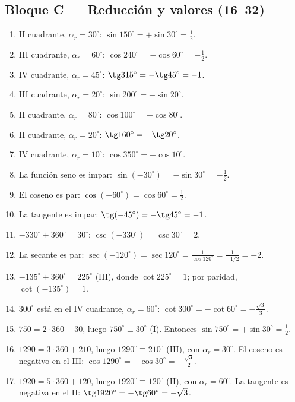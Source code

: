 \documentclass[12pt, letterpaper]{article}
\providecommand{\sen}{\sin}
\begin{document}
\subsection*{Bloque C — Reducción y valores (16--32)}
\begin{enumerate}[leftmargin=*, label=\textbf{\arabic*.}, start=16]
  \item II cuadrante, $\alpha_r=30^\circ$: $\sen 150^\circ=+\sen 30^\circ=\frac12$.
  \item III cuadrante, $\alpha_r=60^\circ$: $\cos 240^\circ=-\cos 60^\circ=-\frac12$.
  \item IV cuadrante, $\alpha_r=45^\circ$: $\tg 315^\circ=-\tg 45^\circ=-1$.
  \item III cuadrante, $\alpha_r=20^\circ$: $\sen 200^\circ=-\sen 20^\circ$.
  \item II cuadrante, $\alpha_r=80^\circ$: $\cos 100^\circ=-\cos 80^\circ$.
  \item II cuadrante, $\alpha_r=20^\circ$: $\tg 160^\circ=-\tg 20^\circ$.
  \item IV cuadrante, $\alpha_r=10^\circ$: $\cos 350^\circ=+\cos 10^\circ$.
  \item La función seno es impar: $\sen(-30^\circ)=-\sen 30^\circ=-\frac12$.
  \item El coseno es par: $\cos(-60^\circ)=\cos 60^\circ=\frac12$.
  \item La tangente es impar: $\tg(-45^\circ)=-\tg 45^\circ=-1$.
  \item $-330^\circ+360^\circ=30^\circ$: $\csc(-330^\circ)=\csc 30^\circ=2$.
  \item La secante es par: $\sec(-120^\circ)=\sec 120^\circ=\frac{1}{\cos 120^\circ}=\frac{1}{-1/2}=-2$.
  \item $-135^\circ+360^\circ=225^\circ$ (III), donde $\cot 225^\circ=1$; por paridad, $\cot(-135^\circ)=1$.
  \item $300^\circ$ está en el IV cuadrante, $\alpha_r=60^\circ$: $\cot 300^\circ=-\cot 60^\circ=-\frac{\sqrt{3}}{3}$.
  \item $750=2\cdot360+30$, luego $750^\circ\equiv30^\circ$ (I). Entonces $\sen 750^\circ=+\sen 30^\circ=\frac12$.
  \item $1290=3\cdot360+210$, luego $1290^\circ\equiv210^\circ$ (III), con $\alpha_r=30^\circ$. El coseno es negativo en el III: $\cos 1290^\circ=-\cos 30^\circ=-\frac{\sqrt{3}}{2}$.
  \item $1920=5\cdot360+120$, luego $1920^\circ\equiv120^\circ$ (II), con $\alpha_r=60^\circ$. La tangente es negativa en el II: $\tg 1920^\circ=-\tg 60^\circ=-\sqrt{3}$.
\end{enumerate}
\end{document}
